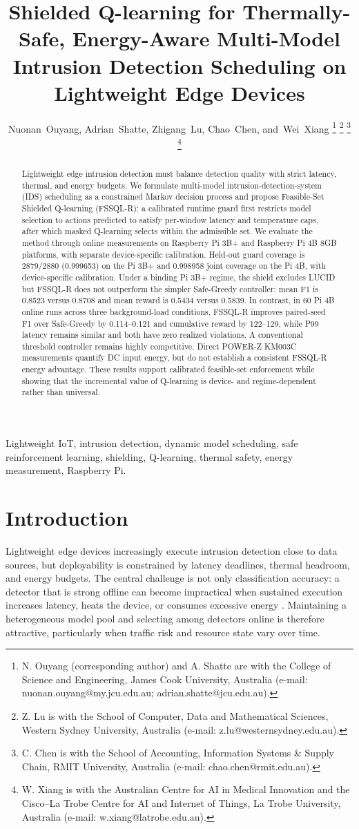 \documentclass[journal]{IEEEtran}
\title{Shielded Q-learning for Thermally-Safe, Energy-Aware Multi-Model Intrusion Detection Scheduling on Lightweight Edge Devices}
\author{Nuonan~Ouyang, Adrian~Shatte, Zhigang~Lu, Chao~Chen, and~Wei~Xiang%
\thanks{N. Ouyang (corresponding author) and A. Shatte are with the College of Science and Engineering, James Cook University, Australia (e-mail: nuonan.ouyang@my.jcu.edu.au; adrian.shatte@jcu.edu.au).}%
\thanks{Z. Lu is with the School of Computer, Data and Mathematical Sciences, Western Sydney University, Australia (e-mail: z.lu@westernsydney.edu.au).}%
\thanks{C. Chen is with the School of Accounting, Information Systems \& Supply Chain, RMIT University, Australia (e-mail: chao.chen@rmit.edu.au).}%
\thanks{W. Xiang is with the Australian Centre for AI in Medical Innovation and the Cisco--La Trobe Centre for AI and Internet of Things, La Trobe University, Australia (e-mail: w.xiang@latrobe.edu.au).}%
}
\begin{document}
\maketitle

\begin{abstract}
Lightweight edge intrusion detection must balance detection quality with strict latency, thermal, and energy budgets. We formulate multi-model intrusion-detection-system (IDS) scheduling as a constrained Markov decision process and propose Feasible-Set Shielded Q-learning (FSSQL-R): a calibrated runtime guard first restricts model selection to actions predicted to satisfy per-window latency and temperature caps, after which masked Q-learning selects within the admissible set. We evaluate the method through online measurements on Raspberry Pi 3B+ and Raspberry Pi 4B 8GB platforms, with separate device-specific calibration. Held-out guard coverage is 2879/2880 (0.999653) on the Pi 3B+ and 0.998958 joint coverage on the Pi 4B, with device-specific calibration. Under a binding Pi 3B+ regime, the shield excludes LUCID but FSSQL-R does not outperform the simpler Safe-Greedy controller: mean F1 is 0.8523 versus 0.8708 and mean reward is 0.5434 versus 0.5839. In contrast, in 60 Pi 4B online runs across three background-load conditions, FSSQL-R improves paired-seed F1 over Safe-Greedy by 0.114--0.121 and cumulative reward by 122--129, while P99 latency remains similar and both have zero realized violations. A conventional threshold controller remains highly competitive. Direct POWER-Z KM003C measurements quantify DC input energy, but do not establish a consistent FSSQL-R energy advantage. These results support calibrated feasible-set enforcement while showing that the incremental value of Q-learning is device- and regime-dependent rather than universal.
\end{abstract}

\begin{IEEEkeywords}
Lightweight IoT, intrusion detection, dynamic model scheduling, safe reinforcement learning, shielding, Q-learning, thermal safety, energy measurement, Raspberry Pi.
\end{IEEEkeywords}

\section{Introduction}
Lightweight edge devices increasingly execute intrusion detection close to data sources, but deployability is constrained by latency deadlines, thermal headroom, and energy budgets. The central challenge is not only classification accuracy: a detector that is strong offline can become impractical when sustained execution increases latency, heats the device, or consumes excessive energy \cite{banbury2021mlperftiny,reddi2019mlperfinference,tan2024thermalnpu}. Maintaining a heterogeneous model pool and selecting among detectors online is therefore attractive, particularly when traffic risk and resource state vary over time.
\end{document}
